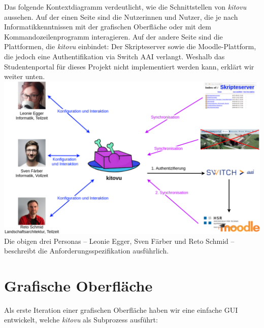 \documentclass[a4paper]{article}
\let\oldsection\section
\renewcommand\section{\clearpage\oldsection}
\begin{document}
Das folgende Kontextdiagramm verdeutlicht, wie die Schnittstellen von \emph{kitovu} aussehen. Auf der einen Seite  sind die Nutzerinnen und Nutzer, die je nach Informatikkenntnissen mit der grafischen Oberfläche oder mit dem Kommandozeilenprogramm interagieren. Auf der andere Seite sind die Plattformen, die \emph{kitovu} einbindet: Der Skripteserver sowie die Moodle-Plattform, die jedoch eine Authentifikation via Switch AAI verlangt. Weshalb das Studentenportal für dieses Projekt nicht implementiert werden kann, erklärt wir weiter unten. \\

\includegraphics[width=40em]{./img/kontextdiagramm.png} \\

Die obigen drei Personas -- Leonie Egger, Sven Färber und Reto Schmid -- beschreibt die Anforderungsspezifikation ausführlich.

\section{Grafische Oberfläche}


Als erste Iteration einer grafischen Oberfläche haben wir eine einfache GUI
entwickelt, welche \emph{kitovu} als Subprozess ausführt:
\end{document}
